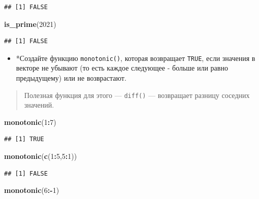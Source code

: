\documentclass[]{book}
\newenvironment{Shaded}{\begin{snugshade}}{\end{snugshade}}
\newcommand{\KeywordTok}[1]{\textcolor[rgb]{0.13,0.29,0.53}{\textbf{#1}}}
\newcommand{\DecValTok}[1]{\textcolor[rgb]{0.00,0.00,0.81}{#1}}
\newcommand{\OperatorTok}[1]{\textcolor[rgb]{0.81,0.36,0.00}{\textbf{#1}}}
\newcommand{\NormalTok}[1]{#1}
\providecommand{\tightlist}{%
  \setlength{\itemsep}{0pt}\setlength{\parskip}{0pt}}
\begin{document}
\begin{verbatim}
## [1] FALSE
\end{verbatim}

\begin{Shaded}
\begin{Highlighting}[]
\KeywordTok{is_prime}\NormalTok{(}\DecValTok{2021}\NormalTok{)}
\end{Highlighting}
\end{Shaded}

\begin{verbatim}
## [1] FALSE
\end{verbatim}

\begin{itemize}
\tightlist
\item
  *Создайте функцию \texttt{monotonic()}, которая возвращает
  \texttt{TRUE}, если значения в векторе не убывают (то есть каждое
  следующее - больше или равно предыдущему) или не возврастают.
\end{itemize}

\begin{quote}
Полезная функция для этого --- \texttt{diff()} --- возвращает разницу
соседних значений.
\end{quote}

\begin{Shaded}
\begin{Highlighting}[]
\KeywordTok{monotonic}\NormalTok{(}\DecValTok{1}\OperatorTok{:}\DecValTok{7}\NormalTok{)}
\end{Highlighting}
\end{Shaded}

\begin{verbatim}
## [1] TRUE
\end{verbatim}

\begin{Shaded}
\begin{Highlighting}[]
\KeywordTok{monotonic}\NormalTok{(}\KeywordTok{c}\NormalTok{(}\DecValTok{1}\OperatorTok{:}\DecValTok{5}\NormalTok{,}\DecValTok{5}\OperatorTok{:}\DecValTok{1}\NormalTok{))}
\end{Highlighting}
\end{Shaded}

\begin{verbatim}
## [1] FALSE
\end{verbatim}

\begin{Shaded}
\begin{Highlighting}[]
\KeywordTok{monotonic}\NormalTok{(}\DecValTok{6}\OperatorTok{:-}\DecValTok{1}\NormalTok{)}
\end{Highlighting}
\end{Shaded}
\end{document}
